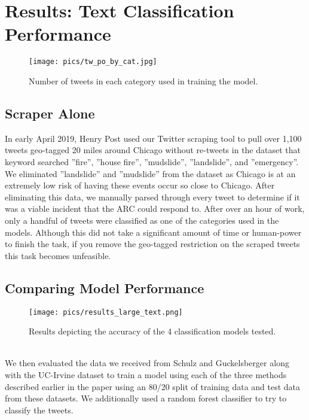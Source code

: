 \documentclass[titlepage, 12pt]{article}
\begin{document}
\section{Results: Text Classification Performance}
\begin{figure}[h!]
\centering
\texttt{[image: pics/tw\_po\_by\_cat.jpg]}
\caption{Number of tweets in each category used in training the model.}
\label{fig:classified_tweet_count}
\end{figure}

\subsection{Scraper Alone}
\hspace{0.5 cm}In early April 2019, Henry Post used our Twitter scraping tool to pull over 1,100 tweets geo-tagged 20 miles around Chicago without re-tweets in the dataset that keyword searched ''fire'', ''house fire'', ''mudslide'', ''landslide'', and ''emergency''. We eliminated ''landslide'' and ''mudslide'' from the dataset as Chicago is at an extremely low risk of having these events occur so close to Chicago. After eliminating this data, we manually parsed through every tweet to determine if it was a viable incident that the ARC could respond to. After over an hour of work, only a handful of tweets were classified as one of the categories used in the models. Although this did not take a significant amount of time or human-power to finish the task, if you remove the geo-tagged restriction on the scraped tweets this task becomes unfeasible.
\subsection{Comparing Model Performance}

\begin{figure}[h!]
\centering
\texttt{[image: pics/results\_large\_text.png]}
\caption{Results depicting the accuracy of the 4 classification models tested.}
\label{fig:model_results}
\end{figure}\\

\hspace{0.5 cm}We then evaluated the data we received from Schulz and Guckelsberger \citep{CT.2015} along with the UC-Irvine dataset \citep{UCI.2016} to train a model using each of the three methods described earlier in the paper using an 80/20 split of training data and test data from these datasets. We additionally used a random forest classifier to try to classify the tweets.\\
\end{document}
